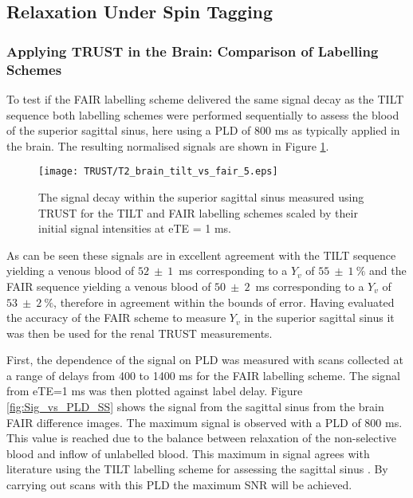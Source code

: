 \subsection{\ttwo Relaxation Under Spin Tagging}
\subsubsection{Applying \ac{TRUST} in the Brain: Comparison of Labelling Schemes}

To test if the \ac{FAIR} labelling scheme delivered the same signal decay as the \ac{TILT} sequence both labelling schemes were performed sequentially to assess the blood \ttwo of the superior sagittal sinus, here using a \ac{PLD} of 800 ms as typically applied in the brain. The resulting normalised signals are shown in Figure \ref{fig:TILT_vs_FAIR}.
\begin{figure}[H]
	\centering
	\texttt{[image: TRUST/T2\_brain\_tilt\_vs\_fair\_5.eps]}
	\caption{The signal decay within the superior sagittal sinus measured using \ac{TRUST} for the \ac{TILT} and \ac{FAIR} labelling schemes scaled by their initial signal intensities at eTE = 1 ms.}
	\label{fig:TILT_vs_FAIR}	
\end{figure}

As can be seen these signals are in excellent agreement with the \ac{TILT} sequence yielding a venous blood \ttwo of $52~\pm~1$~ms corresponding to a $Y_v$ of $55~\pm~1~\%$ and the \ac{FAIR} sequence yielding a venous blood \ttwo of $50~\pm~2$~ms corresponding to a $Y_v$ of $53~\pm~2~\%$, therefore in agreement within the bounds of error. Having evaluated the accuracy of the \ac{FAIR} scheme to measure $Y_v$ in the superior sagittal sinus it was then be used for the renal \ac{TRUST} measurements.

First, the dependence of the signal on \ac{PLD} was measured with scans collected at a range of delays from 400 to 1400 ms for the \ac{FAIR} labelling scheme. The signal from \ac{eTE}=1 ms was then plotted against label delay. Figure \ref{fig:Sig_vs_PLD_SS} shows the signal from the sagittal sinus from the brain \ac{FAIR} difference images. The maximum signal is observed with a \ac{PLD} of 800 ms. This value is reached due to the balance between \tone relaxation of the non-selective blood and inflow of unlabelled blood. This maximum in signal agrees with literature using the \ac{TILT} labelling scheme for assessing the sagittal sinus \cite{lu_quantitative_2008}. By carrying out scans with this \ac{PLD} the maximum \ac{SNR} will be achieved. 

